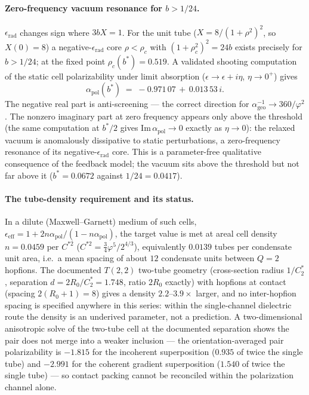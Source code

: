 \documentclass[11pt,a4paper]{article}
\theoremstyle{definition}
\theoremstyle{remark}
\newcommand{\vp}{\varphi}
\newcommand{\aInv}{\alpha^{-1}}
\begin{document}
\paragraph{Zero-frequency vacuum resonance for $b>1/24$.}
$\epsilon_{\mathrm{rad}}$ changes sign where $3bX=1$. For the unit tube
($X = 8/(1+\rho^2)^2$, so $X(0)=8$) a negative-$\epsilon_{\mathrm{rad}}$
core $\rho<\rho_c$ with $(1+\rho_c^2)^2 = 24b$ exists precisely for
$b > 1/24$; at the fixed point $\rho_c(b^*) = 0.519$. A validated
shooting computation of the static cell polarizability under limit
absorption ($\epsilon\to\epsilon+i\eta$, $\eta\to0^+$) gives
\[
  \alpha_{\mathrm{pol}}(b^*) \;=\; -0.971\,07 \,+\, 0.013\,53\, i .
\]
The negative real part is anti-screening --- the correct direction for
$\aInv_{\mathrm{geo}} \to 360/\vp^2$. The nonzero imaginary part at
zero frequency appears only above the threshold (the same computation
at $b^*/2$ gives $\mathrm{Im}\,\alpha_{\mathrm{pol}} \to 0$ exactly as
$\eta\to0$): the relaxed vacuum is anomalously dissipative to static
perturbations, a zero-frequency resonance of its
negative-$\epsilon_{\mathrm{rad}}$ core. This is a parameter-free
qualitative consequence of the feedback model; the vacuum sits above
the threshold but not far above it ($b^* = 0.0672$ against
$1/24 = 0.0417$).

\paragraph{The tube-density requirement and its status.}
In a dilute (Maxwell--Garnett) medium of such cells,
$\epsilon_{\mathrm{eff}} =
1 + 2n\alpha_{\mathrm{pol}}/(1-n\alpha_{\mathrm{pol}})$, the target
value is met at areal cell density $n = 0.0459$ per $C^{*2}$
($C^{*2} = \tfrac{3}{4}\vp^5/2^{4/3}$), equivalently $0.0139$ tubes per
condensate unit area, i.e.\ a mean spacing of about $12$ condensate
units between $Q=2$ hopfions. The documented $T(2,2)$ two-tube geometry
(cross-section radius $1/C_2^*$, separation $d = 2R_0/C_2^* = 1.748$,
ratio $2R_0$ exactly) with hopfions at contact (spacing $2(R_0+1)=8$)
gives a density $2.2$--$3.9\times$ larger, and no inter-hopfion spacing
is specified anywhere in this series: within the single-channel
dielectric route the density is an underived parameter, not a
prediction. A two-dimensional anisotropic solve of the two-tube cell at
the documented separation shows the pair does not merge into a weaker
inclusion --- the orientation-averaged pair polarizability is
$-1.815$ for the incoherent superposition ($0.935$ of twice the single
tube) and $-2.991$ for the coherent gradient superposition ($1.540$ of
twice the single tube) --- so contact packing cannot be reconciled
within the polarization channel alone.
\end{document}

